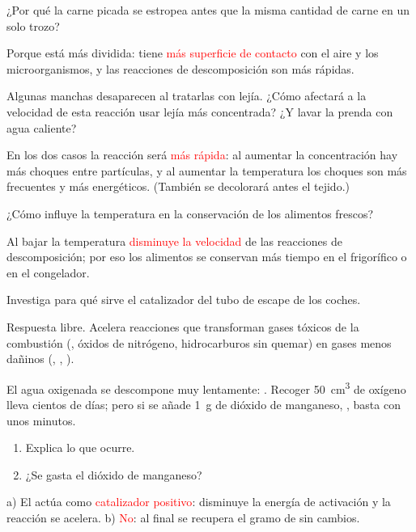 \begin{exercise}
    ¿Por qué la carne picada se estropea antes que la misma cantidad de carne en un solo trozo?
    \begin{solu}
        Porque está más dividida: tiene \textcolor{red}{más superficie de contacto} con el aire y los microorganismos, y las reacciones de descomposición son más rápidas.
    \end{solu}
\end{exercise}

\begin{exercise}
    Algunas manchas desaparecen al tratarlas con lejía. ¿Cómo afectará a la velocidad de esta reacción usar lejía más concentrada? ¿Y lavar la prenda con agua caliente?
    \begin{solu}
        En los dos casos la reacción será \textcolor{red}{más rápida}: al aumentar la concentración hay más choques entre partículas, y al aumentar la temperatura los choques son más frecuentes y más energéticos. (También se decolorará antes el tejido.)
    \end{solu}
\end{exercise}

\begin{exercise}
    ¿Cómo influye la temperatura en la conservación de los alimentos frescos?
    \begin{solu}
        Al bajar la temperatura \textcolor{red}{disminuye la velocidad} de las reacciones de descomposición; por eso los alimentos se conservan más tiempo en el frigorífico o en el congelador.
    \end{solu}
\end{exercise}

\begin{exercise}
    Investiga para qué sirve el catalizador del tubo de escape de los coches.
    \begin{solu}
        Respuesta libre. Acelera reacciones que transforman gases tóxicos de la combustión (, óxidos de nitrógeno, hidrocarburos sin quemar) en gases menos dañinos (, , ).
    \end{solu}
\end{exercise}

\begin{exercise}
    El agua oxigenada se descompone muy lentamente: . Recoger \qty{50}{\cubic\centi\metre} de oxígeno lleva cientos de días; pero si se añade \qty{1}{\gram} de dióxido de manganeso, , basta con unos minutos.
    \begin{enumerate}[label=\alph*)]
        \item Explica lo que ocurre.
        \item ¿Se gasta el dióxido de manganeso?
    \end{enumerate}
    \begin{solu}
        a) El  actúa como \textcolor{red}{catalizador positivo}: disminuye la energía de activación y la reacción se acelera. b) \textcolor{red}{No}: al final se recupera el gramo de  sin cambios.
    \end{solu}
\end{exercise}

